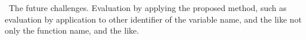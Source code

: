 \documentclass[JIP]{apris}
\begin{document}
 The future challenges. Evaluation by applying the proposed method, such as evaluation by application to other identifier of the variable name, and the like not only the function name, and the like.







\end{document}
